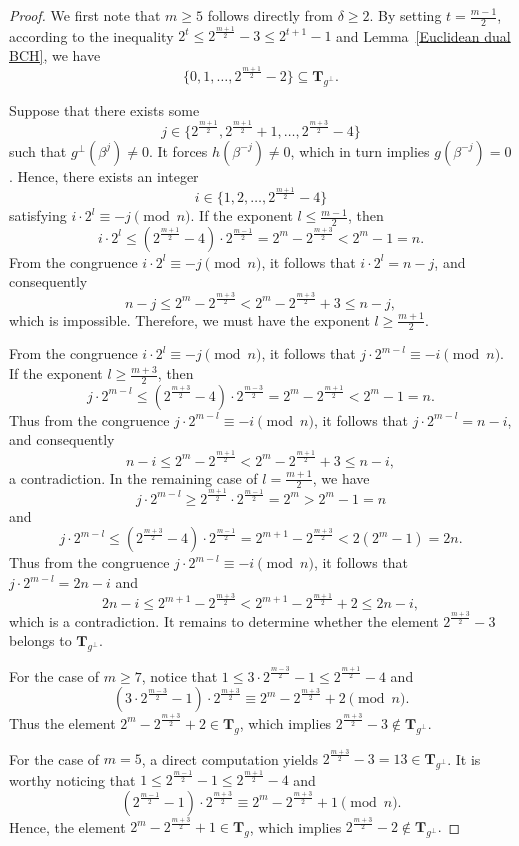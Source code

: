 \documentclass[10pt,a4paper]{amsart}
\begin{document}
\begin{proof}
We first note that $m \ge 5$ follows directly from $\delta \ge 2$. By setting $t = \frac{m-1}{2}$, according to the inequality
\(
2^t \le 2^{\frac{m+1}{2}} - 3 \le 2^{t+1} - 1
\) and Lemma~\ref{Euclidean dual BCH}, we have
\[
\{0,1,\dots,2^{\frac{m+1}{2}} - 2\} \subseteq \mathbf{T}_{g^\perp}.
\]

Suppose that there exists some
\[
j \in \{2^{\frac{m+1}{2}}, 2^{\frac{m+1}{2}} + 1, \dots, 2^{\frac{m+3}{2}} - 4\}
\]
such that $g^\perp(\beta^j) \ne 0$. It forces $h(\beta^{-j}) \ne 0$, which in turn implies $g(\beta^{-j}) = 0$. Hence, there exists an integer
\[
i \in \{1, 2, \dots, 2^{\frac{m+1}{2}} - 4\}
\]
satisfying
\(
i \cdot 2^l \equiv -j \pmod{n}
\). If the exponent $l \le \frac{m-1}{2}$, then
\[
i \cdot 2^l \le (2^{\frac{m+1}{2}} - 4) \cdot 2^{\frac{m-1}{2}}
= 2^m - 2^{\frac{m+3}{2}}
< 2^m - 1 = n.
\]
From the congruence $i \cdot 2^l \equiv -j \pmod{n}$, it follows that $i \cdot 2^l = n - j$, and consequently
\[
n - j \le 2^m - 2^{\frac{m+3}{2}}
< 2^m - 2^{\frac{m+3}{2}} + 3
\le n - j,
\]
which is impossible. Therefore, we must have the exponent $l \ge \frac{m+1}{2}$.

From the congruence $i \cdot 2^l \equiv -j \pmod{n}$, it follows that
\(
j \cdot 2^{m-l} \equiv -i \pmod{n}
\). If the exponent $l \ge \frac{m+3}{2}$, then
\[
j \cdot 2^{m-l} \le (2^{\frac{m+3}{2}} - 4) \cdot 2^{\frac{m-3}{2}}
= 2^m - 2^{\frac{m+1}{2}}
< 2^m - 1 = n.
\]
Thus from the congruence $j \cdot 2^{m-l} \equiv -i \pmod{n}$, it follows that $j \cdot 2^{m-l} = n - i$, and consequently
\[
n - i \le 2^m - 2^{\frac{m+1}{2}}
< 2^m - 2^{\frac{m+1}{2}} + 3
\le n - i,
\]
a contradiction. In the remaining case of $l=\frac{m+1}{2}$, we have
\[
j \cdot 2^{m-l} \ge 2^{\frac{m+1}{2}} \cdot 2^{\frac{m-1}{2}}
= 2^m > 2^m - 1 = n
\]
and
\[
j \cdot 2^{m-l} \le (2^{\frac{m+3}{2}} - 4) \cdot 2^{\frac{m-1}{2}}
= 2^{m+1} - 2^{\frac{m+3}{2}}
< 2(2^m - 1) = 2n.
\]
Thus from the congruence $j \cdot 2^{m-l} \equiv -i \pmod{n}$, it follows that $j \cdot 2^{m-l} = 2n - i$ and
\[
2n - i \le 2^{m+1} - 2^{\frac{m+3}{2}}
< 2^{m+1} - 2^{\frac{m+1}{2}} + 2
\le 2n - i,
\]
which is a contradiction. It remains to determine whether the element $2^{\frac{m+3}{2}} - 3$ belongs to $\mathbf{T}_{g^\perp}$.

For the case of $m \ge 7$, notice that
\(
1 \le 3 \cdot 2^{\frac{m-3}{2}} - 1 \le 2^{\frac{m+1}{2}} - 4
\)
and
\[
(3 \cdot 2^{\frac{m-3}{2}} - 1) \cdot 2^{\frac{m+3}{2}}
\equiv 2^m - 2^{\frac{m+3}{2}} + 2 \pmod{n}.
\]
Thus the element $2^m - 2^{\frac{m+3}{2}} + 2 \in \mathbf{T}_g$, which implies
\(
2^{\frac{m+3}{2}} - 3 \notin \mathbf{T}_{g^\perp}.
\)

For the case of $m = 5$, a direct computation yields
\(
2^{\frac{m+3}{2}} - 3 = 13 \in \mathbf{T}_{g^\perp}
\). It is worthy noticing that
\(
1 \le 2^{\frac{m-1}{2}} - 1 \le 2^{\frac{m+1}{2}} - 4
\)
and
\[
(2^{\frac{m-1}{2}} - 1) \cdot 2^{\frac{m+3}{2}}
\equiv 2^m - 2^{\frac{m+3}{2}} + 1 \pmod{n}.
\]
Hence, the element $2^m - 2^{\frac{m+3}{2}} + 1 \in \mathbf{T}_g$, which implies
\(
2^{\frac{m+3}{2}} - 2 \notin \mathbf{T}_{g^\perp}.
\)
\end{proof}
\end{document}
